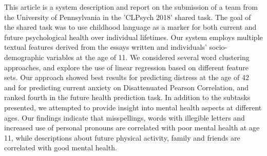 This article is a system description and report on the submission of a team from the University of Pennsylvania in the 'CLPsych 2018' shared task. The goal of the shared task was to use childhood language as a marker for both current and future psychological health over individual lifetimes. Our system employs multiple textual features derived from the essays written and individuals' socio-demographic variables at the age of 11. We considered several word clustering approaches, and explore the use of linear regression based on different feature sets. Our approach showed best results for predicting distress at the age of 42 and for predicting current anxiety on Disattenuated Pearson Correlation, and ranked fourth in the future health prediction task. In addition to the subtasks presented, we attempted to provide insight into mental health aspects at different ages. Our findings indicate that misspellings, words with illegible letters and increased use of personal pronouns are correlated with poor mental health at age 11, while descriptions about future physical activity, family and friends are correlated with good mental health.
